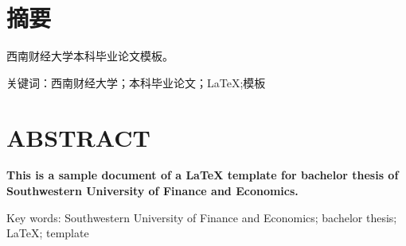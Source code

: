 \section*{摘要}
西南财经大学本科毕业论文模板。

\noindent
\textsf{关键词：西南财经大学；本科毕业论文；\LaTeX;模板}

\clearpage
\section*{ABSTRACT}
{\bfseries
This is a sample document of a \LaTeX{} template for bachelor thesis of Southwestern University of Finance and Economics.

\noindent
{Key words: Southwestern University of Finance and Economics; bachelor thesis; \LaTeX; template}
}
\clearpage
